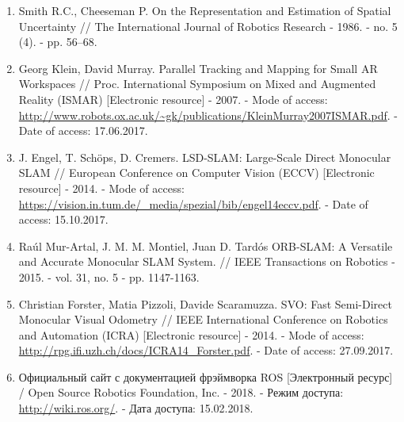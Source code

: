 \begin{enumerate}
    
    \item \label{itm:cheeseman} Smith R.C., Cheeseman P. On the Representation and Estimation of Spatial Uncertainty // The International Journal of Robotics Research - 1986. - no. 5 (4). - pp. 56–68.
    
    \item \label{itm:ptam} Georg Klein, David Murray. Parallel Tracking and Mapping for Small AR Workspaces // Proc. International Symposium on Mixed and Augmented Reality (ISMAR) [Electronic resource] - 2007. - Mode of access: \url{http://www.robots.ox.ac.uk/~gk/publications/KleinMurray2007ISMAR.pdf}. - Date of access: 17.06.2017.
    
    \item \label{itm:lsd} J. Engel, T. Schöps, D. Cremers. LSD-SLAM: Large-Scale Direct Monocular SLAM // European Conference on Computer Vision (ECCV) [Electronic resource] - 2014. - Mode of access: \url{https://vision.in.tum.de/_media/spezial/bib/engel14eccv.pdf}. - Date of access: 15.10.2017.
    
    \item \label{itm:orbslam} Raúl Mur-Artal, J. M. M. Montiel, Juan D. Tardós ORB-SLAM: A Versatile and Accurate Monocular SLAM System. // IEEE Transactions on Robotics - 2015. - vol. 31, no. 5 - pp. 1147-1163.
    
    \item \label{itm:svo} Christian Forster, Matia Pizzoli, Davide Scaramuzza. SVO: Fast Semi-Direct Monocular Visual Odometry // IEEE International Conference on Robotics and Automation (ICRA) [Electronic resource] - 2014. - Mode of access: \url{http://rpg.ifi.uzh.ch/docs/ICRA14_Forster.pdf}. - Date of access: 27.09.2017.
    
    \item \label{itm:last}\label{itm:ros} Официальный сайт с документацией фрэймворка ROS [Электронный ресурс] /  Open Source Robotics Foundation, Inc. - 2018. - Режим доступа: \url{http://wiki.ros.org/}. - Дата доступа: 15.02.2018.
\end{enumerate}

\newpage

